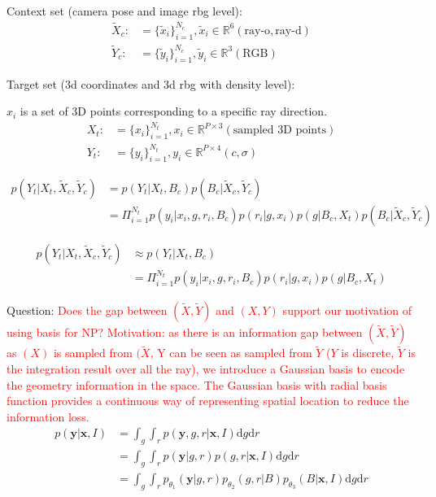 Context set (camera pose and image rbg level): 
\begin{align}
\tilde{X}_c:&= \{ \tilde{x}_i \}_{i=1}^{N_c}, \tilde{x}_i \in \mathbb{R}^{6} (\text{ray-o}, \text{ray-d})\\
\tilde{Y}_c:&= \{ \tilde{y}_i \}_{i=1}^{N_c}, \tilde{y}_i \in \mathbb{R}^{3} (\text{RGB})
\end{align}

Target set (3d coordinates and 3d rbg with density level):

$x_i$ is a set of 3D points corresponding to a specific ray direction. 
\begin{align}
X_t:&= \{ x_i \}_{i=1}^{N_t}, x_i \in \mathbb{R}^{P\times3} (\text{sampled 3D points})\\
Y_t:&= \{ y_i \}_{i=1}^{N_t}, y_i \in \mathbb{R}^{P\times4} (c,\sigma)
\end{align}

\begin{align}
    p(Y_t|X_t, \tilde{X}_c, \tilde{Y}_c) & = p(Y_t|X_t,B_c)p(B_c|\tilde{X}_c, \tilde{Y}_c) \\
    &= \Pi_{i=1}^{N_t} p(y_i|x_i, g, r_i, B_c) p(r_i|g, x_i) p(g|B_c, X_t) p(B_c|\tilde{X}_c, \tilde{Y}_c)
\end{align}

\begin{align}
    p(Y_t|X_t, \tilde{X}_c, \tilde{Y}_c) & \approx p(Y_t|X_t,B_c) \\
    &= \Pi_{i=1}^{N_t} p(y_i|x_i, g, r_i, B_c) p(r_i|g, x_i) p(g|B_c, X_t)
\end{align}

Question: 
\textcolor{red}{Does the gap between $(\tilde{X},\tilde{Y})$ and $(X,Y)$ support our motivation of using basis for NP? Motivation: as there is an information gap between $(\tilde{X},\tilde{Y})$ as $(X)$ is sampled from $(\tilde{X}$, Y can be seen as sampled from $\tilde{Y}$ ($Y$ is discrete, $\tilde{Y}$ is the integration result over all the ray), we introduce a Gaussian basis to encode the geometry information in the space. The Gaussian basis with radial basis function provides a continuous way of representing spatial location to reduce the information loss. 
}
\begin{align}
    p(\mathbf{y}|\mathbf{x}, I) & = \int_{g} \int_{r}  p(\mathbf{y}, g, r |\mathbf{x}, I) \mathrm{d}g  \mathrm{d}r \\
    &=  \int_{g} \int_{r}  p(\mathbf{y}| g, r) p(g, r | \mathbf{x}, I) \mathrm{d}g  \mathrm{d}r \\
    &= \int_{g} \int_{r}  p_{\theta_1}(\mathbf{y}| g, r) p_{\theta_2}(g, r | B) p_{\theta_3}(B|\mathbf{x}, I) \mathrm{d}g  \mathrm{d}r 
\end{align}


